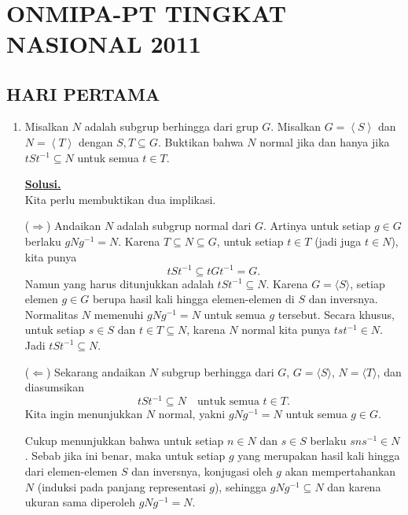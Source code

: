 \documentclass[12pt,twoside]{article}
\author{Firmansyah M.I.D}
\newenvironment{solution}
{
	\par\noindent\textbf{\underline{Solusi.}}\\
}
{
	\par
}
\begin{document}
\thispagestyle{empty}

\pagebreak
\nopagecolor
$~$
\thispagestyle{empty}
\pagebreak

\rhead{}
\tableofcontents
\pagebreak
\chead{}
\section{ONMIPA-PT TINGKAT NASIONAL 2011}
\subsection{HARI PERTAMA}
\begin{enumerate}
  \item Misalkan $N$ adalah subgrup berhingga dari grup $G$. Misalkan $G=\left<S\right>$ dan $N=\left<T\right>$ dengan $S,T\subseteq G$. Buktikan bahwa $N$ normal jika dan hanya jika $tSt^{-1}\subseteq N$ untuk semua $t\in T$.
        \begin{solution}
          Kita perlu membuktikan dua implikasi.

          ($\Rightarrow$) Andaikan $N$ adalah subgrup normal dari $G$. Artinya untuk setiap $g\in G$ berlaku $gNg^{-1}=N$. Karena $T\subseteq N\subseteq G$, untuk setiap $t\in T$ (jadi juga $t\in N$), kita punya
          \[
            tSt^{-1}\subseteq tGt^{-1}=G.
          \]
          Namun yang harus ditunjukkan adalah $tSt^{-1}\subseteq N$. Karena $G=\langle S\rangle$, setiap elemen $g\in G$ berupa hasil kali hingga elemen-elemen di $S$ dan inversnya. Normalitas $N$ memenuhi $gNg^{-1}=N$ untuk semua $g$ tersebut. Secara khusus, untuk setiap $s\in S$ dan $t\in T\subseteq N$, karena $N$ normal kita punya $tst^{-1}\in N$. Jadi $tSt^{-1}\subseteq N$.

          ($\Leftarrow$) Sekarang andaikan $N$ subgrup berhingga dari $G$, $G=\langle S\rangle$, $N=\langle T\rangle$, dan diasumsikan
          \[
            tSt^{-1}\subseteq N\quad\text{untuk semua }t\in T.
          \]
          Kita ingin menunjukkan $N$ normal, yakni $gNg^{-1}=N$ untuk semua $g\in G$.

          Cukup menunjukkan bahwa untuk setiap $n\in N$ dan $s\in S$ berlaku $sns^{-1}\in N$. Sebab jika ini benar, maka untuk setiap $g$ yang merupakan hasil kali hingga dari elemen-elemen $S$ dan inversnya, konjugasi oleh $g$ akan mempertahankan $N$ (induksi pada panjang representasi $g$), sehingga $gNg^{-1}\subseteq N$ dan karena ukuran sama diperoleh $gNg^{-1}=N$.


\end{solution}
\end{enumerate}
\end{document}
